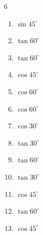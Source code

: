 \begin{multicols}{6}
\begin{enumerate}
  \item $\displaystyle \sin{45^\circ}$


  \item $\displaystyle \tan{60^\circ}$


\columnbreak %

  \item $\displaystyle \tan{60^\circ}$


  \item $\displaystyle \cos{45^\circ}$


  \item $\displaystyle \cos{60^\circ}$


  \item $\displaystyle \cos{60^\circ}$


  \item $\displaystyle \cos{30^\circ}$


  \item $\displaystyle \tan{30^\circ}$


  \item $\displaystyle \tan{60^\circ}$


  \item $\displaystyle \tan{30^\circ}$


  \item $\displaystyle \cos{45^\circ}$


  \item $\displaystyle \tan{60^\circ}$


  \item $\displaystyle \cos{45^\circ}$


\end{enumerate}
\end{multicols}
